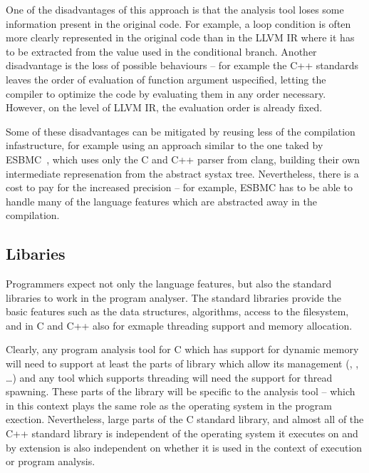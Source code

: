 One of the disadvantages of this approach is that the analysis tool loses some
information present in the original code.
For example, a loop condition is often more clearly represented in the original
code than in the LLVM IR where it has to be extracted from the value used in
the conditional branch.
Another disadvantage is the loss of possible behaviours -- for example the C++ standards leaves the order of evaluation of function argument uspecified, letting the compiler to optimize the code by evaluating them in any order necessary.
However, on the level of LLVM IR, the evaluation order is already fixed.

Some of these disadvantages can be mitigated by reusing less of the compilation
infastructure, for example using an approach similar to the one taked by
ESBMC~\cite{Gadelha2018}, which uses only the C and C++ parser from clang,
building their own intermediate represenation from the abstract systax tree.
Nevertheless, there is a cost to pay for the increased precision -- for example, ESBMC has to be able to handle many of the language features which are abstracted away in the compilation.

\subsection{Libaries}

Programmers expect not only the language features, but also the standard
libraries to work in the program analyser.
The standard libraries provide the basic features such as the data structures, algorithms, access to the filesystem, and in C and C++ also for exmaple threading support and memory allocation.

Clearly, any program analysis tool for C which has support for dynamic memory
will need to support at least the parts of library which allow its management
(, , …) and any tool which supports threading will need
the support for thread spawning.
These parts of the library will be specific to the analysis tool -- which in
this context plays the same role as the operating system in the program
exection.
Nevertheless, large parts of the C standard library, and almost all of the C++
standard library is independent of the operating system it executes on and by
extension is also independent on whether it is used in the context of execution
or program analysis.

